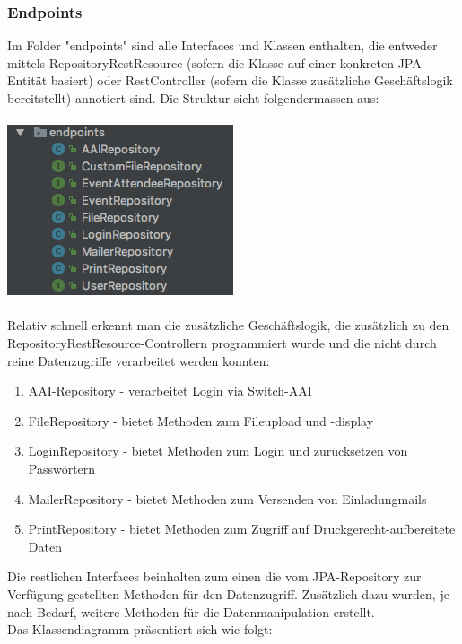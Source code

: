 \documentclass[11pt]{article} %
\begin{document}
\subsubsection{Endpoints}
Im Folder "endpoints" sind alle Interfaces und Klassen enthalten, die entweder mittels RepositoryRestResource (sofern die Klasse auf einer konkreten JPA-Entität basiert) oder RestController (sofern die Klasse zusätzliche Geschäftslogik bereitstellt) annotiert sind. Die Struktur sieht folgendermassen aus:
\\
\\
\includegraphics[scale=0.7]{structure_eventmanagement_endpoints}
\\
\\
Relativ schnell erkennt man die zusätzliche Geschäftslogik, die zusätzlich zu den RepositoryRestResource-Controllern programmiert wurde und die nicht durch reine Datenzugriffe verarbeitet werden konnten:
\begin{enumerate}
\item AAI-Repository - verarbeitet Login via Switch-AAI
\item FileRepository - bietet Methoden zum Fileupload und -display
\item LoginRepository - bietet Methoden zum Login und zurücksetzen von Passwörtern
\item MailerRepository - bietet Methoden zum Versenden von Einladungmails
\item PrintRepository - bietet Methoden zum Zugriff auf Druckgerecht-aufbereitete Daten
\end{enumerate}
Die restlichen Interfaces beinhalten zum einen die vom JPA-Repository zur Verfügung gestellten Methoden für den Datenzugriff. Zusätzlich dazu wurden, je nach Bedarf, weitere Methoden für die Datenmanipulation erstellt.
\\
Das Klassendiagramm präsentiert sich wie folgt:
\\
\\
\end{document}
